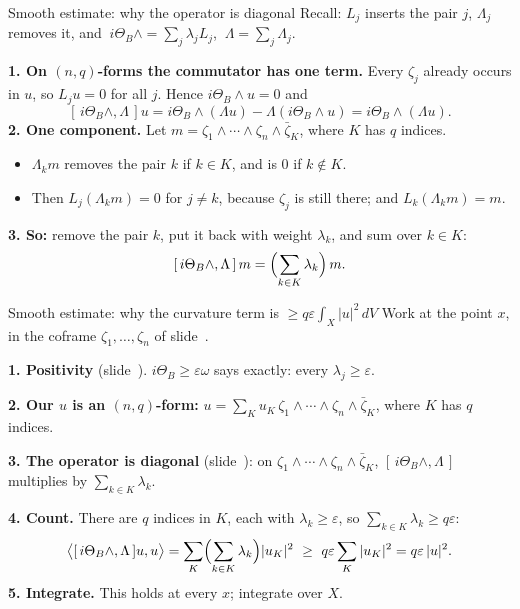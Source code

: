\begin{frame}{Smooth estimate: why the operator is diagonal}
\label{fr:kv-proof-why-the-27}
Recall: \(L_j\) inserts the pair \(j\), \(\Lambda_j\) removes it, and
\(\ i\Theta_B\wedge=\sum_j\lambda_jL_j\), \(\ \Lambda=\sum_j\Lambda_j\).
\par\medskip
\textbf{1. On \((n,q)\)-forms the commutator has one term.} Every \(\zeta_j\) already occurs in \(u\), so \(L_ju=0\) for all \(j\). Hence \(i\Theta_B\wedge u=0\) and
\[
[\,i\Theta_B\wedge,\Lambda\,]u
=i\Theta_B\wedge(\Lambda u)-\Lambda(i\Theta_B\wedge u)
=i\Theta_B\wedge(\Lambda u).
\]
\textbf{2. One component.} Let \(m=\zeta_1\wedge\cdots\wedge\zeta_n\wedge\bar\zeta_K\), where \(K\) has \(q\) indices.
\begin{itemize}
\item \(\Lambda_km\) removes the pair \(k\) if \(k\in K\), and is \(0\) if \(k\notin K\).
\item Then \(L_j(\Lambda_km)=0\) for \(j\ne k\), because \(\zeta_j\) is still there; and \(L_k(\Lambda_km)=m\).
\end{itemize}
\textbf{3. So:} remove the pair \(k\), put it back with weight \(\lambda_k\), and sum over \(k\in K\):
\[
[\,i\Theta_B\wedge,\Lambda\,]\,m=\Bigl(\sum_{k\in K}\lambda_k\Bigr)\,m .
\]
\end{frame}

\begin{frame}{Smooth estimate: why the curvature term is \(\ge q\varepsilon\int_X|u|^2\,dV\)}
\label{fr:kv-proof-why-the-28}
Work at the point \(x\), in the coframe \(\zeta_1,\ldots,\zeta_n\) of slide~\hyperlink{fr:kv-proof-both-forms-23}{\pageref{fr:kv-proof-both-forms-23}}.
\par
\textbf{1. Positivity} (slide~\hyperlink{fr:kv-proof-positivity-says-24}{\pageref{fr:kv-proof-positivity-says-24}}). \(i\Theta_B\ge\varepsilon\omega\) says exactly: every \(\lambda_j\ge\varepsilon\).
\par\medskip
\textbf{2. Our \(u\) is an \((n,q)\)-form:}
\(u=\sum_{K}u_K\,\zeta_1\wedge\cdots\wedge\zeta_n\wedge\bar\zeta_K\), where \(K\) has \(q\) indices.
\par\medskip
\textbf{3. The operator is diagonal} (slide~\hyperlink{fr:kv-proof-why-the-27}{\pageref{fr:kv-proof-why-the-27}}): on \(\zeta_1\wedge\cdots\wedge\zeta_n\wedge\bar\zeta_K\), \([\,i\Theta_B\wedge,\Lambda\,]\) multiplies by \(\sum_{k\in K}\lambda_k\).
\par\medskip
\textbf{4. Count.} There are \(q\) indices in \(K\), each with \(\lambda_k\ge\varepsilon\), so \(\sum_{k\in K}\lambda_k\ge q\varepsilon\):
\[
\big\langle[\,i\Theta_B\wedge,\Lambda\,]u,u\big\rangle
=\sum_K\Bigl(\sum_{k\in K}\lambda_k\Bigr)|u_K|^2
\ \ge\ q\varepsilon\sum_K|u_K|^2=q\varepsilon\,|u|^2 .
\]
\textbf{5. Integrate.} This holds at every \(x\); integrate over \(X\).
\end{frame}


